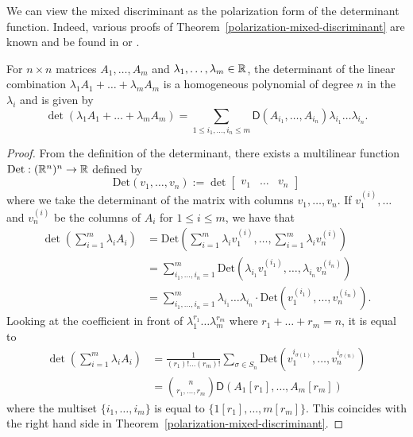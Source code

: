 \documentclass{puthesis-UG}
\begin{document}
We can view the mixed discriminant as the polarization form of the determinant function. Indeed, various proofs of Theorem~\ref{polarization-mixed-discriminant} are known and be found in \cite{Zhao2015-kf} or \cite{schneider_2013}. 

\begin{thm} \label{polarization-mixed-discriminant}
	For $n \times n$ matrices $A_1, \ldots, A_m$ and $\lambda_1, \ldots, \lambda_m \in \mathbb{R}$, the determinant of the linear combination $\lambda_1 A_1 + \ldots + \lambda_m A_m$ is a homogeneous polynomial of degree $n$ in the $\lambda_i$ and is given by 
	\[
		\det (\lambda_1 A_1 + \ldots + \lambda_m A_m) = \sum_{1 \leq i_1, \ldots, i_n \leq m} \mathsf{D}(A_{i_1}, \ldots, A_{i_n}) \lambda_{i_1} \ldots \lambda_{i_n}. 
	\]
\end{thm}

\begin{proof}
	From the definition of the determinant, there exists a multilinear function $\text{Det}: (\mathbb{R}^n)^n \to \mathbb{R}$ defined by 
	\[
		\text{Det}(v_1, \ldots, v_n) := \det \begin{bmatrix} v_1 & \ldots & v_n \end{bmatrix}
	\]
	where we take the determinant of the matrix with columns $v_1, \ldots, v_n$. If $v_1^{(i)}, \ldots$ and $v_n^{(i)}$ be the columns of $A_i$ for $1 \leq i \leq m$, we have that 
	\begin{align*}
		\det \left ( \sum_{i = 1}^m \lambda_i A_i \right ) & = \text{Det} \left ( \sum_{i = 1}^m \lambda_i v_1^{(i)}, \ldots, \sum_{i = 1}^m \lambda_i v_n^{(i)} \right ) \\
		& = \sum_{i_1, \ldots, i_n = 1}^m \text{Det} (\lambda_{i_1} v_{1}^{(i_1)}, \ldots, \lambda_{i_n} v_{n}^{(i_n)} ) \\
		& = \sum_{i_1, \ldots, i_n = 1}^m \lambda_{i_1} \ldots \lambda_{i_n} \cdot \text{Det}(v_{1}^{(i_1)}, \ldots, v_{n}^{(i_n)}).
	\end{align*}
	Looking at the coefficient in front of $\lambda_1^{r_1} \ldots \lambda_m^{r_m}$ where $r_1 + \ldots + r_m = n$, it is equal to 
	\begin{align*}
		[\lambda_1^{r_1} \ldots \lambda_M^{r_m}] \det \left ( \sum_{i = 1}^m \lambda_i A_i \right ) & = \frac{1}{(r_1)! \ldots (r_m)!} \sum_{\sigma \in S_n} \text{Det}(v_1^{i_{\sigma(1)}}, \ldots, v_n^{i_{\sigma(n)}}) \\
		& = \binom{n}{r_1,\ldots, r_m} \mathsf{D}(A_1[r_1], \ldots, A_m[r_m])
	\end{align*}
	where the multiset $\{i_1, \ldots, i_m\}$ is equal to $\{1[r_1], \ldots, m[r_m]\}.$ This coincides with the right hand side in Theorem~\ref{polarization-mixed-discriminant}.
\end{proof}
\end{document}
